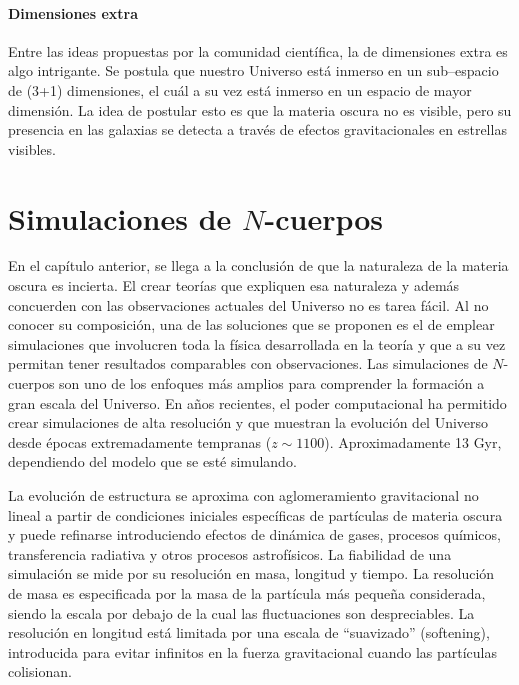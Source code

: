 \documentclass[a4paper,openright,12pt]{book}
\begin{document}
\subsubsection*{Dimensiones extra}

Entre las ideas propuestas por la comunidad científica, la de dimensiones extra es algo intrigante. Se postula que nuestro Universo está inmerso en un sub--espacio de (3+1) dimensiones, el cuál a su vez está inmerso en un espacio de mayor dimensión. La idea de postular esto es que la materia oscura no es visible, pero su presencia en las galaxias se detecta a través de efectos gravitacionales en estrellas visibles.





\chapter{Simulaciones de $N$-cuerpos}\label{cap.nudo}
En el capítulo anterior, se llega a la conclusión de que la naturaleza de la materia oscura es incierta. El crear teorías que expliquen esa naturaleza y además concuerden con las observaciones actuales del Universo no es tarea fácil. Al no conocer su composición, una de las soluciones que se proponen es el de emplear simulaciones que involucren toda la física desarrollada en la teoría y que a su vez permitan tener resultados comparables con observaciones. Las simulaciones de $N$-cuerpos son uno de los enfoques más amplios para comprender la formación a gran escala del Universo. En años recientes, el poder computacional ha permitido crear simulaciones de alta resolución y que muestran la evolución del Universo desde épocas extremadamente tempranas ($z \sim 1100$). Aproximadamente 13 Gyr, dependiendo del modelo que se esté simulando.

La evolución de estructura se aproxima con aglomeramiento gravitacional  no lineal a partir de condiciones iniciales específicas de partículas de materia oscura y puede refinarse introduciendo efectos de dinámica de gases, procesos químicos, transferencia radiativa y otros procesos astrofísicos. La fiabilidad de una simulación se mide por su resolución en masa, longitud y tiempo. La resolución de masa es especificada por la masa de la partícula más pequeña considerada, siendo la escala por debajo de la cual las fluctuaciones son despreciables. La resolución en longitud está limitada por una escala de ``suavizado'' (softening), introducida para evitar infinitos en la fuerza gravitacional cuando las partículas colisionan.
\end{document}
